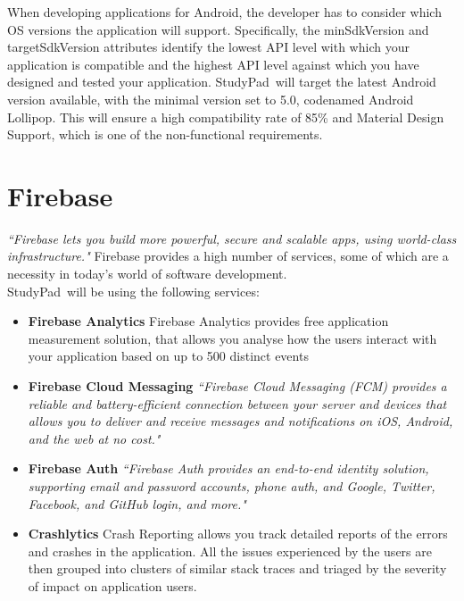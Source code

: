 \documentclass[thesis=B,english]{FITthesis}[2012/10/20]
\newcommand{\appname}{StudyPad}
\newcommand{\quoting}[1]{\textit{``#1"}}
\begin{document}
When developing applications for Android, the developer has to consider which OS versions the application will support. Specifically, the minSdkVersion and targetSdkVersion attributes  identify the lowest API level with which your application is compatible and the highest API level against which you have designed and tested your application. \appname\ will target the latest Android version available, with the minimal version set to 5.0, codenamed Android Lollipop. This will ensure a high compatibility rate of 85\% and Material Design Support, which is one of the non-functional requirements.

\section{Firebase}

\quoting{Firebase lets you build more powerful, secure and scalable apps, using world-class infrastructure.} \cite{firebase} Firebase provides a high number of services, some of which are a necessity in today's world of software development. \\\appname\ will be using the following services:
\begin{itemize}
	\item \textbf{Firebase Analytics} Firebase Analytics provides free application measurement solution, that allows you analyse how the users interact with your application based  on up to 500 distinct events \cite{firebase-analytics}
		\item \textbf{Firebase Cloud Messaging} \quoting{Firebase Cloud Messaging (FCM) provides a reliable and battery-efficient connection between your server and devices that allows you to deliver and receive messages and notifications on iOS, Android, and the web at no cost.}\cite{firebase-messaging}
	\item \textbf{Firebase Auth} \quoting{Firebase Auth  provides an end-to-end identity solution, supporting email and password accounts, phone auth, and Google, Twitter, Facebook, and GitHub login, and more.}\cite{firebase-auth}
	\item \textbf{Crashlytics} Crash Reporting allows you track detailed reports of the errors and crashes in the application. All the issues experienced by the users are then grouped into clusters of similar stack traces and triaged by the severity of impact on application users.\cite{firebase-crash}

\end{itemize}
\end{document}
